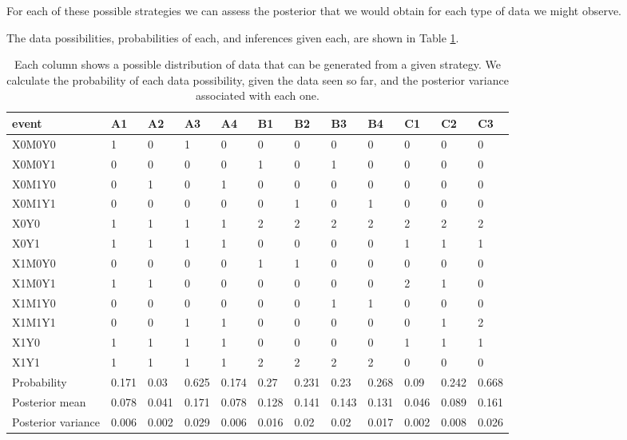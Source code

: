 \documentclass[
  12pt,
]{book}
\begin{document}
For each of these possible strategies we can assess the posterior that we would obtain for each type of data we might observe.

The data possibilities, probabilities of each, and inferences given each, are shown in Table \ref{tab:chselillustration}.

\begin{table}

\caption{\label{tab:chselillustration}Each column shows a possible distribution of data that can be generated from a given strategy. We calculate the probability of each data possibility, given the data seen so far, and the posterior variance associated with each one.}
\centering
\begin{tabular}[t]{l|l|l|l|l|l|l|l|l|l|l|l}
\hline
event & A1 & A2 & A3 & A4 & B1 & B2 & B3 & B4 & C1 & C2 & C3\\
\hline
X0M0Y0 & 1 & 0 & 1 & 0 & 0 & 0 & 0 & 0 & 0 & 0 & 0\\
\hline
X0M0Y1 & 0 & 0 & 0 & 0 & 1 & 0 & 1 & 0 & 0 & 0 & 0\\
\hline
X0M1Y0 & 0 & 1 & 0 & 1 & 0 & 0 & 0 & 0 & 0 & 0 & 0\\
\hline
X0M1Y1 & 0 & 0 & 0 & 0 & 0 & 1 & 0 & 1 & 0 & 0 & 0\\
\hline
X0Y0 & 1 & 1 & 1 & 1 & 2 & 2 & 2 & 2 & 2 & 2 & 2\\
\hline
X0Y1 & 1 & 1 & 1 & 1 & 0 & 0 & 0 & 0 & 1 & 1 & 1\\
\hline
X1M0Y0 & 0 & 0 & 0 & 0 & 1 & 1 & 0 & 0 & 0 & 0 & 0\\
\hline
X1M0Y1 & 1 & 1 & 0 & 0 & 0 & 0 & 0 & 0 & 2 & 1 & 0\\
\hline
X1M1Y0 & 0 & 0 & 0 & 0 & 0 & 0 & 1 & 1 & 0 & 0 & 0\\
\hline
X1M1Y1 & 0 & 0 & 1 & 1 & 0 & 0 & 0 & 0 & 0 & 1 & 2\\
\hline
X1Y0 & 1 & 1 & 1 & 1 & 0 & 0 & 0 & 0 & 1 & 1 & 1\\
\hline
X1Y1 & 1 & 1 & 1 & 1 & 2 & 2 & 2 & 2 & 0 & 0 & 0\\
\hline
Probability & 0.171 & 0.03 & 0.625 & 0.174 & 0.27 & 0.231 & 0.23 & 0.268 & 0.09 & 0.242 & 0.668\\
\hline
Posterior mean & 0.078 & 0.041 & 0.171 & 0.078 & 0.128 & 0.141 & 0.143 & 0.131 & 0.046 & 0.089 & 0.161\\
\hline
Posterior variance & 0.006 & 0.002 & 0.029 & 0.006 & 0.016 & 0.02 & 0.02 & 0.017 & 0.002 & 0.008 & 0.026\\
\hline
\end{tabular}
\end{table}
\end{document}
